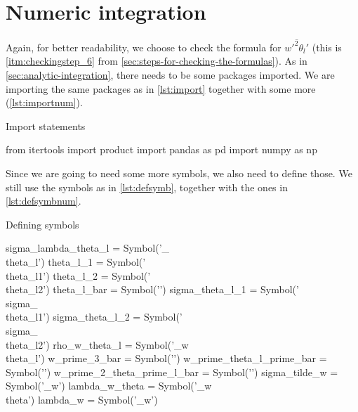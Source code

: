 \section{Numeric integration}\label{sec:numeric-integration}

Again, for better readability, we choose to check the formula for $\overline{w'^2\theta_l'}$
(this is \cref{itm:checkingstep_6} from \cref{sec:steps-for-checking-the-formulas}).
As in \cref{sec:analytic-integration}, there needs to be some packages imported.
We are importing the same packages as in \cref{lst:import} together with some more (\cref{lst:importnum}).
\begin{listing}[!ht]
    \caption{Import statements}
    \label{lst:importnum}
    \begin{pythoncode}
        from itertools import product
        import pandas as pd
        import numpy as np
    \end{pythoncode}
\end{listing}
Since we are going to need some more symbols, we also need to define those.
We still use the symbols as in \cref{lst:defsymb}, together with the ones in \cref{lst:defsymbnum}.
\begin{listing}[!ht]
    \caption{Defining symbols}
    \label{lst:defsymbnum}
    \begin{pythoncode}
        sigma_lambda_theta_l = Symbol('\sigma_{\lambda\\theta_l}')
        theta_l_1 = Symbol('\\theta_{l1}') 
        theta_l_2 = Symbol('\\theta_{l2}')
        theta_l_bar = Symbol('')
        sigma_theta_l_1 = Symbol('\\sigma_{\\theta_{l1}}')
        sigma_theta_l_2 = Symbol('\\sigma_{\\theta_{l2}}')
        rho_w_theta_l = Symbol('\rho_{w\\theta_l}')
        w_prime_3_bar = Symbol('')
        w_prime_theta_l_prime_bar = Symbol('')
        w_prime_2_theta_prime_l_bar = Symbol('')
        sigma_tilde_w = Symbol('\Tilde{\sigma}_w')
        lambda_w_theta = Symbol('\lambda_{w\\theta}')
        lambda_w = Symbol('\lambda_w')
    \end{pythoncode}
\end{listing}


